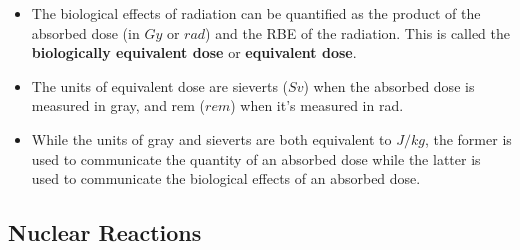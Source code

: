 \documentclass{article}
\begin{document}
\begin{itemize}
  \item The biological effects of radiation can be quantified as the product of the absorbed dose (in $\unit{Gy}$ or $\unit{rad}$) and the RBE of the radiation. This is called the \textbf{biologically equivalent dose} or \textbf{equivalent dose}.

  \item The units of equivalent dose are sieverts ($\unit{Sv}$) when the absorbed dose is measured in gray, and rem ($\unit{rem}$) when it's measured in rad.

  \item While the units of gray and sieverts are both equivalent to $\unit{J/kg}$, the former is used to communicate the quantity of an absorbed dose while the latter is used to communicate the biological effects of an absorbed dose.
\end{itemize}

\subsection{Nuclear Reactions}
\end{document}
